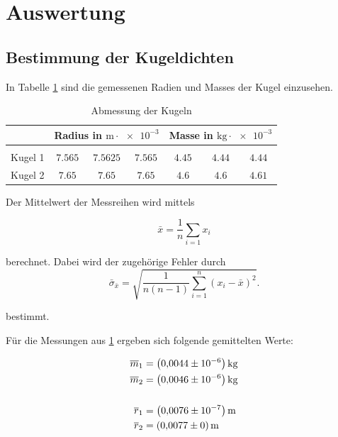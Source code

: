 \section{Auswertung}


\subsection{Bestimmung der Kugeldichten}

In Tabelle \ref{tab:messwerte_kugel} sind die gemessenen Radien und Masses der Kugel 
einzusehen.

\begin{table}
\centering
\begin{tabular} {ccccccc}
	\toprule
  & \multicolumn{3}{c}{Radius in $\si{\meter}\cdot \num{e-3}$}  & \multicolumn{3}{c}{Masse in $\si{\kilogram}\cdot \num{e-3}$} \\
\midrule \\
Kugel 1 & $\num{7.565} $&  $\num{7.5625} $ & $\num{7.565} $  & $\num{4.45}$ & $\num{4.44} $ & $\num{4.44} $ \\
Kugel 2  & $\num{7.65} $&  $\num{7.65} $ & $\num{7.65} $ & $\num{4.6}$ & $\num{4.6} $ & $\num{4.61} $ \\
\bottomrule
\end{tabular}
\caption{Abmessung der Kugeln}
\label{tab:messwerte_kugel}
\end{table}

Der Mittelwert der Messreihen wird mittels

\begin{equation}
\label{eq:mittel}
\bar{x}=\frac{1}{n}\sum_{i=1}x_i
\end{equation}

berechnet. Dabei wird der zugehörige Fehler
durch 
\begin{equation}
\label{eq:stand_ab}
\bar{\sigma}_{\bar{x}}=\sqrt{\frac{1}{n(n-1)}\sum_{i=1}^{n}(x_i-\bar{x})^2}.
\end{equation}

bestimmt.

Für die Messungen aus \ref{tab:messwerte_kugel} ergeben sich 
folgende gemittelten Werte:

\begin{align}
\label{eq:abmessungen_kugel}
\begin{aligned}
\overline{m}_{1}&= \left(\num{0.0044}\pm\num{e-6}\right) \si{\kilogram} \\
\overline{m}_{2}&= \left(\num{0.0046}\pm\num{e-6}\right) \si{\kilogram} \\
\hfill \\
\overline{r}_{1}&= \left(\num{0.0076}\pm\num{e-7}\right) \si{\meter} \\
\overline{r}_{2}&= \left(\num{0.0077}\pm\num{0}\right) \si{\meter} \\
\end{aligned}
\end{align}

